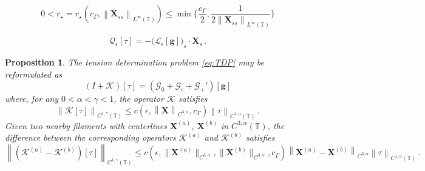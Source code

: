 \documentclass[10pt,a4paper]{amsart}
\newtheorem{proposition}{Proposition}
\newcommand{\T}{\mathbb{T}}
\newcommand{\X}{\bm{X}}
\newcommand{\mc}[1]{\mathcal{#1}}
\newcommand{\norm}[1]{\left\lVert #1 \right\rVert}
\begin{document}
\begin{equation}\label{eq:rstar}
  0<r_\star = r_\star(c_\Gamma,\norm{\X_{ss}}_{L^\infty(\T)}) \le \min\bigg\{\frac{c_\Gamma}{2}, \frac{1}{2\norm{\X_{ss}}_{L^\infty(\T)}}\bigg\}
\end{equation}

\begin{equation}\label{eq:TDP}
\mc{Q}_\epsilon[\tau] = -\big(\mc{L}_\epsilon[\bm{g}]\big)_s\cdot\X_s\,.
\end{equation}

\begin{proposition}\label{prop:TDP_reform}
The tension determination problem \eqref{eq:TDP} may be reformulated as 
  \begin{equation}\label{eq:TDP_reform}
    (I +\mc{K})[\tau] = (\mc{G}_0+\mc{G}_\epsilon+\mc{G}_+')[\bm{g}]
  \end{equation}
where, for any $0<\alpha<\gamma<1$, the operator $\mc{K}$ satisfies
\begin{equation}
  \norm{\mc{K}[\tau]}_{C^{1,\gamma}(\T)} \le c(\epsilon,\norm{\X}_{C^{3,\alpha}},c_\Gamma)\norm{\tau}_{C^{1,\alpha}(\T)}\,.
\end{equation}
Given two nearby filaments with centerlines $\X^{(a)}$, $\X^{(b)}$ in $C^{3,\alpha}(\T)$, the difference between the corresponding operators $\mc{K}^{(a)}$ and $\mc{K}^{(b)}$ satisfies
\begin{equation}
  \norm{(\mc{K}^{(a)}-\mc{K}^{(b)})[\tau]}_{C^{1,\gamma}(\T)} \le c(\epsilon,\|\X^{(a)}\|_{C^{3,\alpha}},\|\X^{(b)}\|_{C^{3,\alpha}},c_\Gamma)\norm{\X^{(a)}-\X^{(b)}}_{C^{3,\alpha}}\norm{\tau}_{C^{1,\alpha}(\T)}\,.
\end{equation}


\end{proposition}
\end{document}
